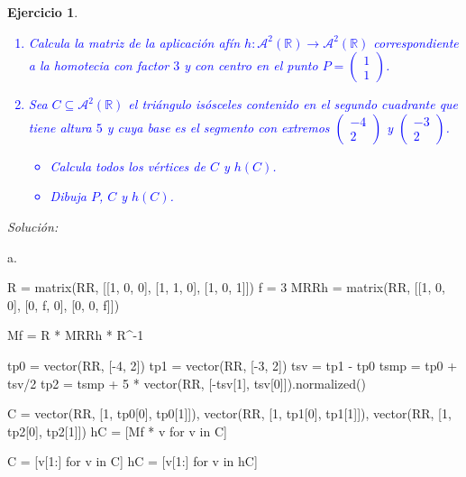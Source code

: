 \documentclass{amsart}
\newtheorem{ejer}{Ejercicio}
\begin{document}
\begin{ejer}
\textcolor{blue}{\begin{enumerate} 
\item[a)] Calcula la matriz de la aplicación afín $h:\mathcal{A}^2(\mathbb R) \to \mathcal{A}^2(\mathbb R)$ correspondiente a la {\sc homotecia} con factor $3$
y con centro en el punto $P=\left( \begin{array}{r} 1 \\ 1 \end{array} \right)$.
\item[b)]Sea $C \subseteq \mathcal{A}^2(\mathbb R)$ el triángulo isósceles contenido en el segundo cuadrante que tiene altura $5$ y cuya base 
es el segmento con extremos $\left( \begin{array}{r} -4 \\ 2 \end{array} \right)$ y $\left( \begin{array}{r} -3 \\ 2 \end{array} \right)$. 
\begin{itemize}
\item Calcula todos los vértices de $C$ y $h(C)$. 
\item Dibuja $P$, $C$ y $h(C)$.
\end{itemize}
\end{enumerate}}
\end{ejer}

{\it Solución:}

a.

\begin{sageblock}
R = matrix(RR, [[1, 0, 0], [1, 1, 0], [1, 0, 1]])
f = 3
MRRh = matrix(RR, [[1, 0, 0], [0, f, 0], [0, 0, f]])

Mf = R * MRRh * R^-1

tp0 = vector(RR, [-4, 2])
tp1 = vector(RR, [-3, 2])
tsv = tp1 - tp0
tsmp = tp0 + tsv/2
tp2 = tsmp + 5 * vector(RR, [-tsv[1], tsv[0]]).normalized()

C = vector(RR, [1, tp0[0], tp0[1]]), vector(RR, [1, tp1[0], tp1[1]]), vector(RR, [1, tp2[0], tp2[1]])
hC = [Mf * v for v in C]

C = [v[1:] for v in C]
hC = [v[1:] for v in hC]
\end{sageblock}

\begin{sagesub}
\begin{center}
\end{center}
\end{sagesub}
\end{document}
